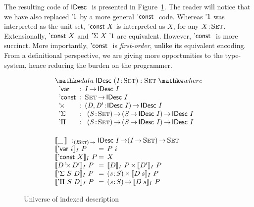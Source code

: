 The resulting code of $\IDesc$ is presented in
Figure~\ref{fig:idesc}. The reader will notice that we have also
replaced $\DUnit$ by a more general $\DConst$ code. Whereas $\DUnit$
was interpreted as the unit set, $\DConst{X}$ is interpreted as $X$,
for any $\Bhab{X}{\Set}$. Extensionally, $\DConst{X}$ and
$\DSigma{X}{\DUnit}$ are equivalent. However, $\DConst$ is more
succinct. More importantly, $\DConst$ is \emph{first-order}, unlike
its equivalent encoding. From a definitional perspective, we are
giving more opportunities to the type-system, hence reducing the
burden on the programmer.

\begin{figure}

\[\stk{
\begin{array}{ll}
\stk{
\data \IDesc{} (\Bhab{\V{I}}{\Set}) : \Set \where \\
\;\;\begin{array}{@{}l@{\::\:\:}l@{\quad}l}
    \DVar{}         & I \To \IDesc{I}                                   \\
    \DConst{}       & \Set \To \IDesc{I}                                \\
    \DProd{}{}      & \PI{\V{D}, \V{D'}}{\IDesc{I}} \IDesc{I}           \\
    \DSigma         & \PI{\V{S}}{\Set} \PIS{S \To \IDesc{I}} \IDesc{I}  \\
    \DPi            & \PI{\V{S}}{\Set} \PIS{S \To \IDesc{I}} \IDesc{I} 
\end{array}
}
\vspace{0.2in}
\\
\stk{
\idescop{\_\:}{}{} :_{\PI{\V{I}}{\Set}} \IDesc{I} \To (\V{I} \To \Set) \To \Set                  \\
\begin{array}{@{}l@{\:=\:\:}ll}
\idescop{\DVar{i}}{I}{P}      &  P~i                                                 \\
\idescop{\DConst{X}}{I}{P}    &  X                                                   \\
\idescop{\DProd{D}{D'}}{I}{P} &  \TIMES{\idescop{D}{I}{P}}{\idescop{D'}{I}{P}}       \\
\idescop{\DSigma{S}{D}}{I}{P} &  \SIGMA{\V{s}}{S} \idescop{D\: s}{I}{P}                    \\
\idescop{\DPi{S}{D}}{I}{P}    &  \PI{\V{s}}{S} \idescop{D\: s}{I}{P}            
\end{array}
}
\end{array}
}\]

\caption{Universe of indexed description}
\label{fig:idesc}

\end{figure}

